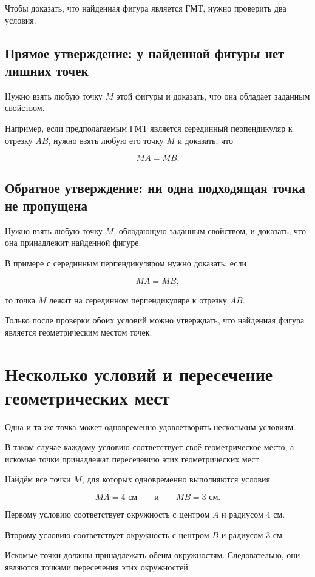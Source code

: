 	Чтобы доказать, что найденная фигура является ГМТ, нужно проверить два условия.
	
		\subsection{Прямое утверждение: у найденной фигуры нет лишних точек}
	
	Нужно взять любую точку \(M\) этой фигуры и доказать,
	что она обладает заданным свойством.
	
	Например, если предполагаемым ГМТ является серединный перпендикуляр
	к отрезку \(AB\), нужно взять любую его точку \(M\) и доказать, что
	
	\[
	MA=MB.
	\]
	
		\subsection{Обратное утверждение: ни одна подходящая точка не пропущена}
	
	Нужно взять любую точку \(M\), обладающую заданным свойством,
	и доказать, что она принадлежит найденной фигуре.
	
	В примере с серединным перпендикуляром нужно доказать:
	если
	
	\[
	MA=MB,
	\]
	
	то точка \(M\) лежит на серединном перпендикуляре к отрезку \(AB\).
	
	\begin{notebox}[Итог]
		Только после проверки обоих условий можно утверждать,
		что найденная фигура является геометрическим местом точек.
	\end{notebox}
	
	\section{Несколько условий и пересечение геометрических мест}
	
	Одна и та же точка может одновременно удовлетворять нескольким условиям.
	
	В таком случае каждому условию соответствует своё геометрическое место,
		а искомые точки принадлежат пересечению этих геометрических мест.
	
	\begin{examplebox}
		Найдём все точки \(M\), для которых одновременно выполняются условия
		
		\[
		MA=4\text{ см}
		\qquad\text{и}\qquad
		MB=3\text{ см}.
		\]
		
		Первому условию соответствует окружность с центром \(A\)
		и радиусом \(4\) см.
		
		Второму условию соответствует окружность с центром \(B\)
		и радиусом \(3\) см.
		
		Искомые точки должны принадлежать обеим окружностям.
		Следовательно, они являются точками пересечения этих окружностей.
	\end{examplebox}

